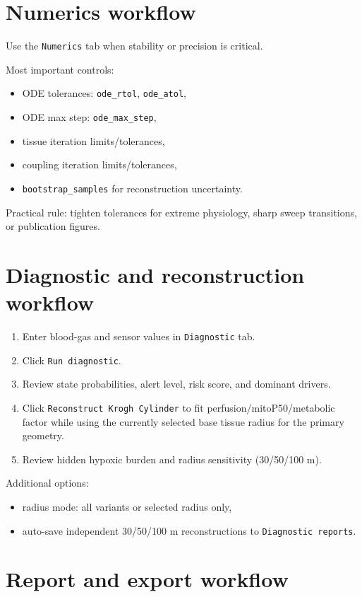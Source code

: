 \documentclass[12pt,a4paper]{article}
\begin{document}
\section{Numerics workflow}
Use the \texttt{Numerics} tab when stability or precision is critical.

Most important controls:
\begin{itemize}
    \item ODE tolerances: \texttt{ode\_rtol}, \texttt{ode\_atol},
    \item ODE max step: \texttt{ode\_max\_step},
    \item tissue iteration limits/tolerances,
    \item coupling iteration limits/tolerances,
    \item \texttt{bootstrap\_samples} for reconstruction uncertainty.
\end{itemize}

Practical rule: tighten tolerances for extreme physiology, sharp sweep transitions, or publication figures.

\section{Diagnostic and reconstruction workflow}
\begin{enumerate}
    \item Enter blood-gas and sensor values in \texttt{Diagnostic} tab.
    \item Click \texttt{Run diagnostic}.
    \item Review state probabilities, alert level, risk score, and dominant drivers.
    \item Click \texttt{Reconstruct Krogh Cylinder} to fit perfusion/mitoP50/metabolic factor while using the currently selected base tissue radius for the primary geometry.
    \item Review hidden hypoxic burden and radius sensitivity (30/50/100 \textmu m).
\end{enumerate}

Additional options:
\begin{itemize}
    \item radius mode: all variants or selected radius only,
    \item auto-save independent 30/50/100 \textmu m reconstructions to \texttt{Diagnostic reports}.
\end{itemize}

\section{Report and export workflow}
\end{document}
